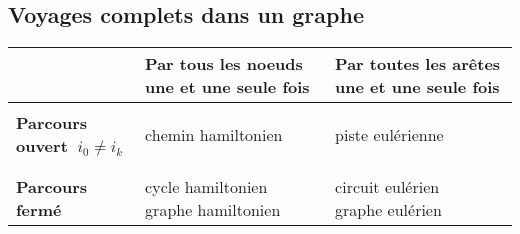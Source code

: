 \subsection{Voyages complets dans un graphe}
\begin{center}
\begin{tabular}{p{4cm}|p{3.5cm}|p{3.5cm}}
&\textbf{Par tous les noeuds une et une seule fois}&\textbf{Par toutes les arêtes une et une seule fois}\\
\hline
&&\\
\textbf{Parcours ouvert $\: i_0 \neq i_k$}&chemin hamiltonien&piste eulérienne\\
&&\\
\hline
&&\\
\textbf{Parcours fermé}&cycle hamiltonien$\qquad$ graphe hamiltonien&circuit eulérien $\qquad$ graphe eulérien\\
\end{tabular}
\end{center}


